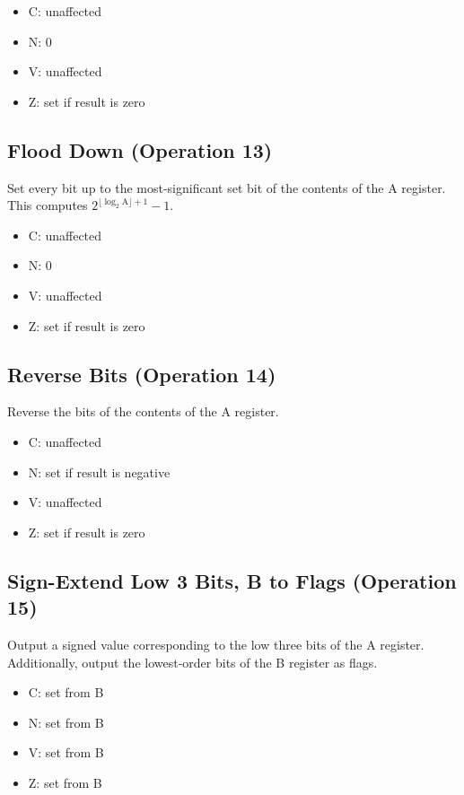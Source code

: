 \documentclass[11pt]{book}
\begin{document}
\begin{multicols}{2}
  \begin{itemize}
  \item C: unaffected
  \item N: 0
  \item V: unaffected
  \item Z: set if result is zero
  \end{itemize}
\end{multicols}

\subsection{Flood Down (Operation 13)}
Set every bit up to the most-significant set bit
of the contents of the A register.
This computes \(2^{\lfloor\log_2\text{A}\rfloor+1}-1\).

\begin{multicols}{2}
  \begin{itemize}
  \item C: unaffected
  \item N: 0
  \item V: unaffected
  \item Z: set if result is zero
  \end{itemize}
\end{multicols}

\subsection{Reverse Bits (Operation 14)}
Reverse the bits of the contents of the A register.

\begin{multicols}{2}
  \begin{itemize}
  \item C: unaffected
  \item N: set if result is negative
  \item V: unaffected
  \item Z: set if result is zero
  \end{itemize}
\end{multicols}

\subsection{Sign-Extend Low 3 Bits, B to Flags (Operation 15)}
Output a signed value corresponding
to the low three bits of the A register.
Additionally, output the lowest-order bits of the B register
as flags.

\begin{multicols}{2}
  \begin{itemize}
  \item C: set from B
  \item N: set from B
  \item V: set from B
  \item Z: set from B
  \end{itemize}
\end{multicols}
\end{document}
